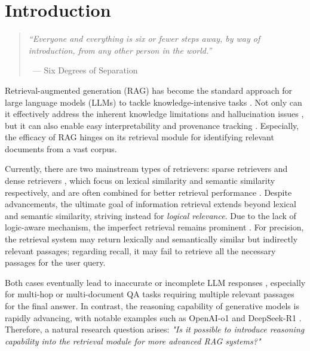 \section{Introduction}
\label{sec:introduction}
\label{introduction}

\begin{quote}
    \textit{``Everyone and everything is six or fewer steps away, by way of introduction, from any other person in the world.''} 
\begin{flushright}
\qquad\;\;\, --- Six Degrees of Separation
\end{flushright}
\end{quote}
Retrieval-augmented generation (RAG) has become the standard approach for large language models (LLMs) to tackle knowledge-intensive tasks \citep{guu2020retrieval,lewis2020retrieval, izacard2022few, min-etal-2023-nonparametric, ram2023context,liang2025saferag}. Not only can it effectively address the inherent knowledge limitations and hallucination issues \cite{zhang_sirens_2023}, but it can also enable easy interpretability and provenance tracking \citep{akyurek-etal-2022-towards}. Especially, the efficacy of RAG hinges on its retrieval module for identifying relevant documents from a vast corpus.


Currently, there are two mainstream types of retrievers: sparse retrievers \citep{TF-IDF,BM25} and dense retrievers \citep{BGE,e52024multilingual,sturua2024jina,wang_qaencoder_2024}, which focus on lexical similarity and semantic similarity respectively, and are often combined for better retrieval performance \citep{sawarkar2024blended}.
Despite advancements, the ultimate goal of information retrieval extends beyond lexical and semantic similarity, striving instead for \textit{logical relevance}. Due to the lack of logic-aware mechanism, the imperfect retrieval remains prominent \citep{wang2024astute, shao2024scaling, dai2024unifying, su2024bright, su2024brightrealisticchallengingbenchmark}. For precision, the retrieval system may return lexically and semantically similar but indirectly relevant passages; regarding recall, it may fail to retrieve all the necessary passages for the user query. 

Both cases eventually lead to inaccurate or incomplete LLM responses \citep{chen2024benchmarking,xiang2024certifiably,zou2024poisonedrag}, especially for multi-hop or multi-document QA tasks requiring multiple relevant passages for the final answer.  
In contrast, the reasoning capability of generative models is rapidly advancing, with notable examples such as OpenAI-o1 \citep{jaech2024openai} and DeepSeek-R1 \citep{guo2025deepseek}. Therefore, a natural research question arises: \textit{"Is it possible to introduce reasoning capability into the retrieval module for more advanced RAG systems?"} 

